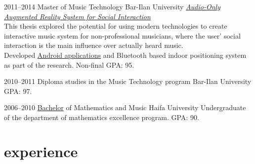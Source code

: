 \documentclass[]{friggeri-cv}  %
\begin{document}
\begin{entrylist}

    \entry
    {2011--2014}
    {Master {\normalfont of Music Technology}}
    {Bar-Ilan University}
    {\href{http://tomgurion.blogspot.co.il/p/master-thesis.html}{\emph{Audio-Only Augmented Reality System for Social Interaction}}\\
    This thesis explored the potential for using modern technologies to create interactive music system for non-professional musicians, where the user' social interaction is the main influence over actually heard music.\\
    Developed \href{https://play.google.com/store/apps/developer?id=Nagasaki45}{Android applications} and Bluetooth based indoor positioning system as part of the research. Non-final GPA: 95.}
    
\end{entrylist}
\begin{entrylist}

    \entry
    {2010--2011}
    {Diploma studies {\normalfont in the Music Technology program}}
    {Bar-Ilan University}
    {GPA: 97.}
    
\end{entrylist}
\begin{entrylist}

    \entry
    {2006--2010}
    {\href{http://db.tt/i2NzAkni}{Bachelor} {\normalfont of Mathematics and Music}}
    {Haifa University}
    {Undergraduate of the department of mathematics excellence program. GPA: 90.}

\end{entrylist}


\section{experience}
\end{document}
